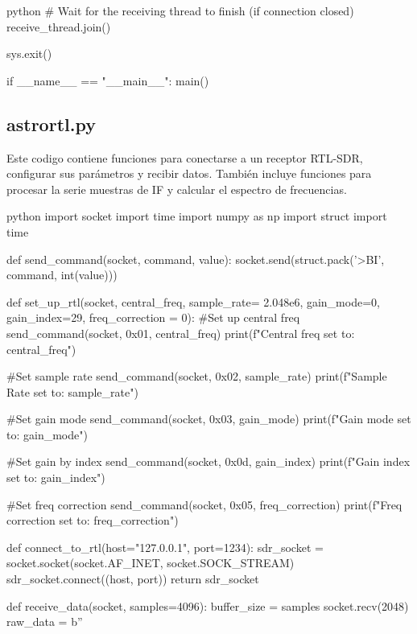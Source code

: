 \begin{appendixs}
\begin{sourcecode}[]{python}{}
    # Wait for the receiving thread to finish (if connection closed)
    receive_thread.join()

    sys.exit()

if __name__ == "__main__":
    main()


\end{sourcecode}

\subsection{astrortl.py}

Este codigo contiene funciones para conectarse a un receptor RTL-SDR, configurar sus parámetros y recibir datos. También incluye funciones para procesar la serie muestras de IF y calcular el espectro de frecuencias.

\begin{sourcecode}[]{python}{}
    import socket
    import time
    import numpy as np
    import struct
    import time
    
    def send_command(socket, command, value):
        socket.send(struct.pack('>BI', command, int(value)))
        
    def set_up_rtl(socket, central_freq, sample_rate= 2.048e6, gain_mode=0, gain_index=29, freq_correction = 0):
        #Set up central freq
        send_command(socket, 0x01, central_freq)
        print(f"Central freq set to: {central_freq}")
    
        #Set sample rate
        send_command(socket, 0x02, sample_rate)
        print(f"Sample Rate set to: {sample_rate}")
    
        #Set gain mode
        send_command(socket, 0x03, gain_mode)
        print(f"Gain mode set to: {gain_mode}")
    
        #Set gain by index
        send_command(socket, 0x0d, gain_index)
        print(f"Gain index set to: {gain_index}")
    
        #Set freq correction
        send_command(socket, 0x05, freq_correction)
        print(f"Freq correction set to: {freq_correction}")
    
    def connect_to_rtl(host="127.0.0.1", port=1234):
        sdr_socket = socket.socket(socket.AF_INET, socket.SOCK_STREAM)
        sdr_socket.connect((host, port))
        return sdr_socket
    
    def receive_data(socket, samples=4096):
        buffer_size = samples
        socket.recv(2048)
        raw_data = b''
        

\end{sourcecode}
\end{appendixs}
